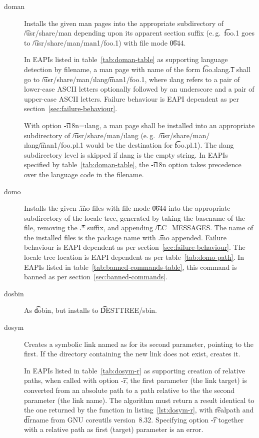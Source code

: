 \begin{description}
\item[doman] Installs the given man pages into the appropriate subdirectory of \t{/usr/share/man}
    depending upon its apparent section suffix (e.\,g.\ \t{foo.1} goes to
    \t{/usr/share/man/man1/foo.1}) with file mode \t{0644}.

     In EAPIs listed in table~\ref{tab:doman-table} as supporting
    language detection by filename, a man page with name of the form \t{foo.}\i{lang}\t{.1} shall
    go to \t{/usr/share/man/}\i{lang}\t{/man1/foo.1}, where \i{lang} refers to a pair of lower-case
    ASCII letters optionally followed by an underscore and a pair of upper-case ASCII letters.
    Failure behaviour is EAPI dependent as per section~\ref{sec:failure-behaviour}.

    With option \t{-i18n=}\i{lang}, a man page shall be installed into an appropriate subdirectory
    of \t{/usr/share/man/}\i{lang} (e.\,g.\ \t{/usr/share/man/}\i{lang}\t{/man1/foo.pl.1} would be
    the destination for \t{foo.pl.1}). The \i{lang} subdirectory level is skipped if \i{lang} is
    the empty string. In EAPIs specified by table~\ref{tab:doman-table}, the \t{-i18n} option takes
    precedence over the language code in the filename.

\item[domo]  Installs the given \t{.mo} files with file mode \t{0644} into
    the appropriate subdirectory of the locale tree, generated by taking the basename of the file,
    removing the \t{.*} suffix, and appending \t{/LC_MESSAGES}\@. The name of the installed files
    is the package name with \t{.mo} appended. Failure behaviour is EAPI dependent as per
    section~\ref{sec:failure-behaviour}. The locale tree location is EAPI dependent as per
    table~\ref{tab:domo-path}.
    In EAPIs listed in table~\ref{tab:banned-commands-table}, this command is banned as per
    section~\ref{sec:banned-commands}.

\item[dosbin] As \t{dobin}, but installs to \t{DESTTREE/sbin}.

\item[dosym] Creates a symbolic link named as for its second parameter, pointing to the first.
    If the directory containing the new link does not exist, creates it.

     In EAPIs listed in table~\ref{tab:dosym-r} as supporting creation
    of relative paths, when called with option \t{-r}, the first parameter (the link target) is
    converted from an absolute path to a path relative to the the second parameter (the link name).
    The algorithm must return a result identical to the one returned by the function in
    listing~\ref{lst:dosym-r}, with \t{realpath} and \t{dirname} from GNU coreutils version~8.32.
    Specifying option \t{-r} together with a relative path as first (target) parameter is an error.


\end{description}
